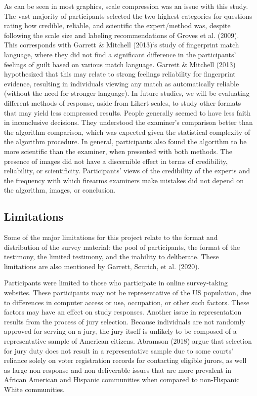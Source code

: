 \documentclass[print]{nuthesis}
\begin{document}
As can be seen in most graphics, scale compression was an issue with this study.
The vast majority of participants selected the two highest categories for questions rating how credible, reliable, and scientific the expert/method was, despite following the scale size and labeling recommendations of Groves et al. (2009).
This corresponds with Garrett \& Mitchell (2013)`s study of fingerprint match language, where they did not find a significant difference in the participants' feelings of guilt based on various match language.
Garrett \& Mitchell (2013) hypothesized that this may relate to strong feelings reliability for fingerprint evidence, resulting in individuals viewing any match as automatically reliable (without the need for stronger language).
In future studies, we will be evaluating different methods of response, aside from Likert scales, to study other formats that may yield less compressed results.
People generally seemed to have less faith in inconclusive decisions.
They understood the examiner's comparison better than the algorithm comparison, which was expected given the statistical complexity of the algorithm procedure.
In general, participants also found the algorithm to be more scientific than the examiner, when presented with both methods.
The presence of images did not have a discernible effect in terms of credibility, reliability, or scientificity.
Participants' views of the credibility of the experts and the frequency with which firearms examiners make mistakes did not depend on the algorithm, images, or conclusion.

\hypertarget{limitations}{%
\subsection{Limitations}\label{limitations}}

Some of the major limitations for this project relate to the format and distribution of the survey material: the pool of participants, the format of the testimony, the limited testimony, and the inability to deliberate.
These limitations are also mentioned by Garrett, Scurich, et al. (2020).

Participants were limited to those who participate in online survey-taking websites.
These participants may not be representative of the US population, due to differences in computer access or use, occupation, or other such factors.
These factors may have an effect on study responses.
Another issue in representation results from the process of jury selection.
Because individuals are not randomly approved for serving on a jury, the jury itself is unlikely to be composed of a representative sample of American citizens.
Abramson (2018) argue that selection for jury duty does not result in a representative sample due to some courts' reliance solely on voter registration records for contacting eligible jurors, as well as large non response and non deliverable issues that are more prevalent in African American and Hispanic communities when compared to non-Hispanic White communities.
\end{document}
